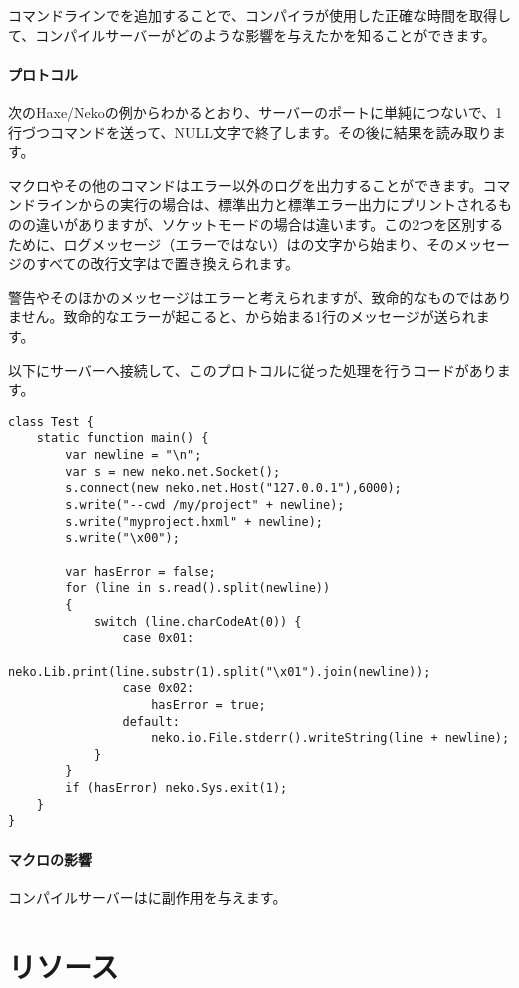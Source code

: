 コマンドラインでを追加することで、コンパイラが使用した正確な時間を取得して、コンパイルサーバーがどのような影響を与えたかを知ることができます。

\paragraph{プロトコル}
次のHaxe/Nekoの例からわかるとおり、サーバーのポートに単純につないで、1行づつコマンドを送って、NULL文字で終了します。その後に結果を読み取ります。

マクロやその他のコマンドはエラー以外のログを出力することができます。コマンドラインからの実行の場合は、標準出力と標準エラー出力にプリントされるものの違いがありますが、ソケットモードの場合は違います。この2つを区別するために、ログメッセージ（エラーではない）はの文字から始まり、そのメッセージのすべての改行文字はで置き換えられます。

警告やそのほかのメッセージはエラーと考えられますが、致命的なものではありません。致命的なエラーが起こると、から始まる1行のメッセージが送られます。

以下にサーバーへ接続して、このプロトコルに従った処理を行うコードがあります。

\begin{lstlisting}
class Test {
    static function main() {
		var newline = "\n";
        var s = new neko.net.Socket();
        s.connect(new neko.net.Host("127.0.0.1"),6000);
        s.write("--cwd /my/project" + newline);
        s.write("myproject.hxml" + newline);
        s.write("\x00");
		
        var hasError = false;
        for (line in s.read().split(newline))
		{
            switch (line.charCodeAt(0)) {
				case 0x01: 
					neko.Lib.print(line.substr(1).split("\x01").join(newline));
				case 0x02: 
					hasError = true;
				default: 
					neko.io.File.stderr().writeString(line + newline);
            }
		}
        if (hasError) neko.Sys.exit(1);
    }
}
\end{lstlisting}

\paragraph{マクロの影響}

コンパイルサーバーはに副作用を与えます。

\section{リソース}
\label{cr-resources}

